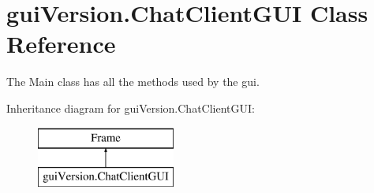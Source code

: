 \hypertarget{classgui_version_1_1_chat_client_g_u_i}{}\section{gui\+Version.\+Chat\+Client\+G\+U\+I Class Reference}
\label{classgui_version_1_1_chat_client_g_u_i}


The Main class has all the methods used by the gui.  


Inheritance diagram for gui\+Version.\+Chat\+Client\+G\+U\+I\+:\begin{figure}[H]
\begin{center}
\leavevmode
\includegraphics[height=2.000000cm]{classgui_version_1_1_chat_client_g_u_i}
\end{center}
\end{figure}
